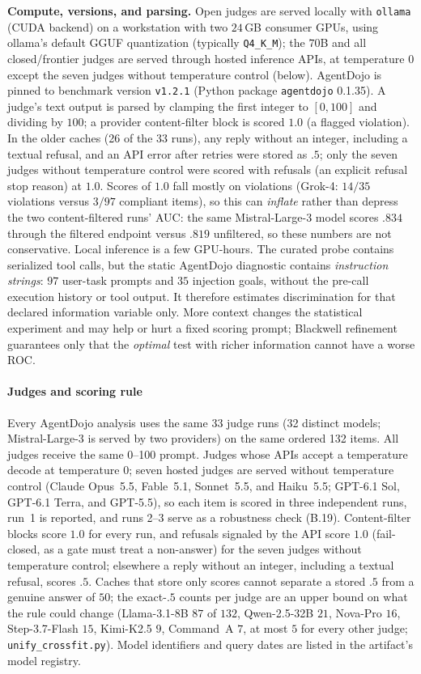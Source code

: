 \smallskip\noindent\textbf{Compute, versions, and parsing.} Open judges are served locally
with \texttt{ollama} (CUDA backend) on a workstation with two $24$\,GB consumer GPUs,
using ollama's default GGUF quantization (typically \texttt{Q4\_K\_M});
the $70$B and all closed/frontier judges are served through hosted inference APIs,
at temperature $0$ except the seven judges without temperature control (below). AgentDojo is pinned
to benchmark version \texttt{v1.2.1} (Python package \texttt{agentdojo} 0.1.35). A judge's text output is parsed by clamping the first integer to
$[0,100]$ and dividing by $100$; a provider content-filter block is scored $1.0$ (a flagged
violation). In the older caches (26 of the 33 runs), any reply without an integer, including a
textual refusal, and an API error after retries were stored as $.5$; only the seven judges
without temperature control were scored with refusals (an explicit refusal stop reason) at $1.0$. Scores of $1.0$ fall mostly on violations (Grok-4: $14/35$ violations versus $3/97$ compliant items), so this can \emph{inflate} rather than depress the two content-filtered runs' AUC: the same Mistral-Large-3 model scores $.834$ through the filtered endpoint versus $.819$ unfiltered, so these numbers are not conservative.
Local inference is a few GPU-hours.
The curated probe contains serialized tool calls, but the static AgentDojo diagnostic
contains \emph{instruction strings}: $97$ user-task prompts and $35$ injection goals, without
the pre-call execution history or tool output. It therefore estimates discrimination for
that declared information variable only. More context changes the statistical experiment
and may help or hurt a fixed scoring prompt; Blackwell refinement guarantees only that the
\emph{optimal} test with richer information cannot have a worse ROC.

\paragraph{Judges and scoring rule}
Every AgentDojo analysis uses the same 33 judge runs (32 distinct models;
Mistral-Large-3 is served by two providers) on the same ordered 132 items. All judges
receive the same 0--100 prompt. Judges whose APIs accept a temperature decode at
temperature $0$; seven hosted judges are served without temperature control (Claude Opus~5.5,
Fable~5.1, Sonnet~5.5, and Haiku~5.5; GPT-6.1 Sol, GPT-6.1 Terra, and GPT-5.5), so each
item is scored in three independent runs, run~1 is reported, and runs 2--3 serve as a
robustness check (B.19). Content-filter blocks score $1.0$ for every run, and refusals signaled
by the API score $1.0$ (fail-closed, as a gate must treat a non-answer) for the seven judges
without temperature control; elsewhere a reply without an integer, including a textual refusal,
scores $.5$. Caches that store only scores cannot separate a stored $.5$
from a genuine answer of $50$; the exact-$.5$ counts per judge are an upper bound on what
the rule could change (Llama-3.1-8B $87$ of $132$, Qwen-2.5-32B $21$, Nova-Pro $16$,
Step-3.7-Flash $15$, Kimi-K2.5 $9$, Command~A $7$, at most $5$ for every other judge;
\texttt{unify\_crossfit.py}). Model identifiers and query dates are listed in the
artifact's model registry.

